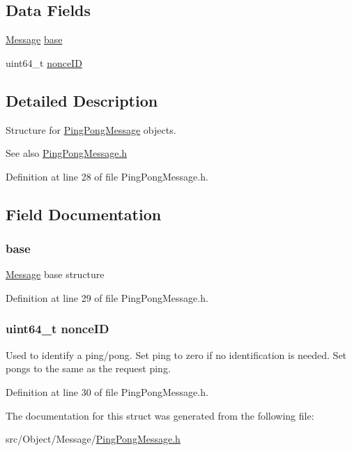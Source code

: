 \subsection*{Data Fields}
\begin{DoxyCompactItemize}
\item 
\hyperlink{struct_message}{Message} \hyperlink{struct_ping_pong_message_a8987f797adf70c3e174fd64cc68bc933}{base}
\item 
uint64\_\-t \hyperlink{struct_ping_pong_message_a8a30b0f39810620d125df55c023c996e}{nonceID}
\end{DoxyCompactItemize}


\subsection{Detailed Description}
Structure for \hyperlink{struct_ping_pong_message}{PingPongMessage} objects. 

\begin{DoxySeeAlso}{See also}
\hyperlink{_ping_pong_message_8h}{PingPongMessage.h} 
\end{DoxySeeAlso}


Definition at line 28 of file PingPongMessage.h.



\subsection{Field Documentation}
\hypertarget{struct_ping_pong_message_a8987f797adf70c3e174fd64cc68bc933}{
\subsubsection[{base}]{ {\bf base}}}
\label{struct_ping_pong_message_a8987f797adf70c3e174fd64cc68bc933}
\hyperlink{struct_message}{Message} base structure 

Definition at line 29 of file PingPongMessage.h.

\hypertarget{struct_ping_pong_message_a8a30b0f39810620d125df55c023c996e}{
\subsubsection[{nonceID}]{\setlength{\rightskip}{0pt plus 5cm}uint64\_\-t {\bf nonceID}}}
\label{struct_ping_pong_message_a8a30b0f39810620d125df55c023c996e}
Used to identify a ping/pong. Set ping to zero if no identification is needed. Set pongs to the same as the request ping. 

Definition at line 30 of file PingPongMessage.h.



The documentation for this struct was generated from the following file:\begin{DoxyCompactItemize}
\item 
src/Object/Message/\hyperlink{_ping_pong_message_8h}{PingPongMessage.h}\end{DoxyCompactItemize}
